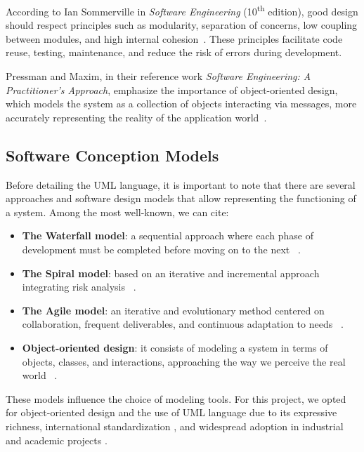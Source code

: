 \documentclass[12pt,a4paper]{report}
\begin{document}
According to Ian Sommerville in \textit{Software Engineering} (10\textsuperscript{th} edition), good design should respect principles such as modularity, separation of concerns, low coupling between modules, and high internal cohesion~\cite{sommerville2015}. These principles facilitate code reuse, testing, maintenance, and reduce the risk of errors during development.

Pressman and Maxim, in their reference work \textit{Software Engineering: A Practitioner's Approach}, emphasize the importance of object-oriented design, which models the system as a collection of objects interacting via messages, more accurately representing the reality of the application world~\cite{pressman2014}.

\subsection{Software Conception Models}
Before detailing the UML language, it is important to note that there are several approaches and software design models that allow representing the functioning of a system. Among the most well-known, we can cite:

\begin{itemize}
  \item \textbf{The Waterfall model}: a sequential approach where each phase of development must be completed before moving on to the next ~\cite{royce1970}.
  \item \textbf{The Spiral model}: based on an iterative and incremental approach integrating risk analysis ~\cite{boehm1988}.
  \item \textbf{The Agile model}: an iterative and evolutionary method centered on collaboration, frequent deliverables, and continuous adaptation to needs ~\cite{beck2001, cockburn2002}.
  \item \textbf{Object-oriented design}: it consists of modeling a system in terms of objects, classes, and interactions, approaching the way we perceive the real world ~\cite{booch1994, gamma1995}.
\end{itemize}

These models influence the choice of modeling tools. For this project, we opted for object-oriented design and the use of UML language due to its expressive richness, international standardization \cite{omg2017}, and widespread adoption in industrial and academic projects \cite{rumbaugh2004, fowler2004}.
\end{document}
